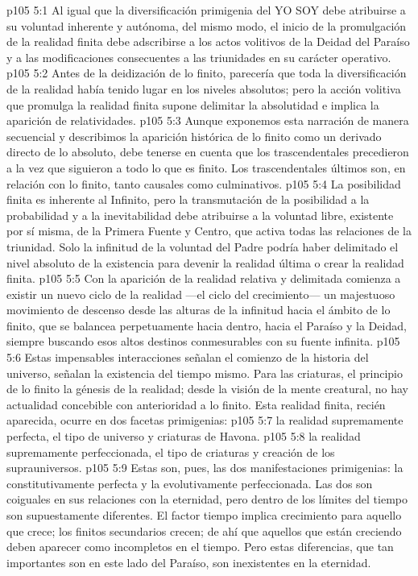 \vs p105 5:1 Al igual que la diversificación primigenia del YO SOY debe atribuirse a su voluntad inherente y autónoma, del mismo modo, el inicio de la promulgación de la realidad finita debe adscribirse a los actos volitivos de la Deidad del Paraíso y a las modificaciones consecuentes a las triunidades en su carácter operativo.
\vs p105 5:2 Antes de la deidización de lo finito, parecería que toda la diversificación de la realidad había tenido lugar en los niveles absolutos; pero la acción volitiva que promulga la realidad finita supone delimitar la absolutidad e implica la aparición de relatividades.
\vs p105 5:3 \pc Aunque exponemos esta narración de manera secuencial y describimos la aparición histórica de lo finito como un derivado directo de lo absoluto, debe tenerse en cuenta que los trascendentales precedieron a la vez que siguieron a todo lo que es finito. Los trascendentales últimos son, en relación con lo finito, tanto causales como culminativos.
\vs p105 5:4 \pc La posibilidad finita es inherente al Infinito, pero la transmutación de la posibilidad a la probabilidad y a la inevitabilidad debe atribuirse a la voluntad libre, existente por sí misma, de la Primera Fuente y Centro, que activa todas las relaciones de la triunidad. Solo la infinitud de la voluntad del Padre podría haber delimitado el nivel absoluto de la existencia para devenir la realidad última o crear la realidad finita.
\vs p105 5:5 Con la aparición de la realidad relativa y delimitada comienza a existir un nuevo ciclo de la realidad ---el ciclo del crecimiento--- un majestuoso movimiento de descenso desde las alturas de la infinitud hacia el ámbito de lo finito, que se balancea perpetuamente hacia dentro, hacia el Paraíso y la Deidad, siempre buscando esos altos destinos conmesurables con su fuente infinita.
\vs p105 5:6 Estas impensables interacciones señalan el comienzo de la historia del universo, señalan la existencia del tiempo mismo. Para las criaturas, el principio de lo finito  la génesis de la realidad; desde la visión de la mente creatural, no hay actualidad concebible con anterioridad a lo finito. Esta realidad finita, recién aparecida, ocurre en dos facetas primigenias:
\vs p105 5:7  la realidad supremamente perfecta, el tipo de universo y criaturas de Havona.
\vs p105 5:8  la realidad supremamente perfeccionada, el tipo de criaturas y creación de los suprauniversos.
\vs p105 5:9 \pc Estas son, pues, las dos manifestaciones primigenias: la constitutivamente perfecta y la evolutivamente perfeccionada. Las dos son coiguales en sus relaciones con la eternidad, pero dentro de los límites del tiempo son supuestamente diferentes. El factor tiempo implica crecimiento para aquello que crece; los finitos secundarios crecen; de ahí que aquellos que están creciendo deben aparecer como incompletos en el tiempo. Pero estas diferencias, que tan importantes son en este lado del Paraíso, son inexistentes en la eternidad.
